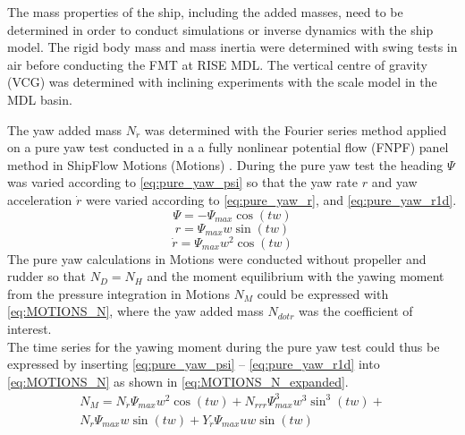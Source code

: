 The mass properties of the ship, including the added masses, need to be determined in order to conduct simulations or inverse dynamics with the ship model. The rigid body mass and mass inertia were determined with swing tests in air before conducting the FMT at RISE MDL. The vertical centre of gravity (VCG) was determined with inclining experiments with the scale model in the MDL basin.

The yaw added mass $N_{\dot{r}}$ was determined with the Fourier series method \citep{sakamotoURANSSimulationsStatic2012} applied on a pure yaw test conducted in a a fully nonlinear potential flow (FNPF) panel method in ShipFlow Motions (Motions) \citep{kjellbergFullyNonlinearUnsteady2013}.
During the pure yaw test the heading $\Psi$ was varied according to \autoref{eq:pure_yaw_psi} so that the yaw rate $r$ and yaw acceleration $\dot{r}$ were varied according to \autoref{eq:pure_yaw_r}, and \autoref{eq:pure_yaw_r1d}.
\begin{equation}
    \Psi = - \Psi_{max} \cos{\left(t w \right)}
    \label{eq:pure_yaw_psi}
\end{equation}
\begin{equation}
    r = \Psi_{max} w \sin{\left(t w \right)}
    \label{eq:pure_yaw_r}
\end{equation}
\begin{equation}
    \dot{r} = \Psi_{max} w^{2} \cos{\left(t w \right)}
    \label{eq:pure_yaw_r1d}
\end{equation}
The pure yaw calculations in Motions were conducted without propeller and rudder so that $N_D=N_H$ and the moment equilibrium with the yawing moment from the pressure integration in Motions $N_M$ could be expressed with \autoref{eq:MOTIONS_N}, where the yaw added mass $N_{dot{r}}$ was the coefficient of interest. 
\begin{equation}
    
    \label{eq:MOTIONS_N}
\end{equation}
The time series for the yawing moment during the pure yaw test could thus be expressed by inserting \autoref{eq:pure_yaw_psi} -- \autoref{eq:pure_yaw_r1d} into \autoref{eq:MOTIONS_N} as shown in \autoref{eq:MOTIONS_N_expanded}.
\begin{equation}
    \begin{align}    
    N_{M} = N_{\dot{r}} \Psi_{max} w^{2} \cos{\left(t w \right)} + N_{rrr} \Psi_{max}^{3} w^{3} \sin^{3}{\left(t w \right)} + \\ 
    N_{r} \Psi_{max} w \sin{\left(t w \right)} + Y_{\dot{r}} \Psi_{max} u w \sin{\left(t w \right)}
    \end{align}
    \label{eq:MOTIONS_N_expanded}
\end{equation}
